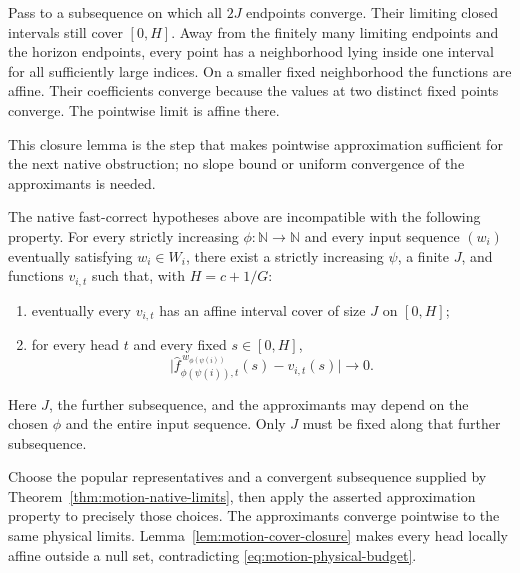 \begin{proofoutline}
Pass to a subsequence on which all $2J$ endpoints converge.  Their limiting
closed intervals still cover $[0,H]$.  Away from the finitely many limiting
endpoints and the horizon endpoints, every point has a neighborhood lying
inside one interval for all sufficiently large indices.  On a smaller fixed
neighborhood the functions are affine.  Their coefficients converge because
the values at two distinct fixed points converge.  The pointwise limit is
affine there.
\end{proofoutline}

This closure lemma is the step that makes pointwise approximation sufficient
for the next native obstruction; no slope bound or uniform convergence of
the approximants is needed.

\begin{theorem}
\label{thm:motion-pointwise}
The native fast-correct hypotheses above are incompatible with the following
property.  For every strictly increasing $\phi:\mathbb N\to\mathbb N$ and
every input sequence $(w_i)$ eventually satisfying $w_i\in W_i$, there exist
a strictly increasing $\psi$, a finite $J$, and functions $v_{i,t}$ such that,
with $H=c+1/G$:
\begin{enumerate}
\item eventually every $v_{i,t}$ has an affine interval cover of size $J$ on
$[0,H]$;
\item for every head $t$ and every fixed $s\in[0,H]$,
\[
  \bigl|\widehat f_{\phi(\psi(i)),t}^{\,w_{\phi(\psi(i))}}(s)
                 -v_{i,t}(s)\bigr|\longrightarrow0.
\]
\end{enumerate}
Here $J$, the further subsequence, and the approximants may depend on the
chosen $\phi$ and the entire input sequence.  Only $J$ must be fixed along
that further subsequence.
\end{theorem}

\begin{proofoutline}
Choose the popular representatives and a convergent subsequence supplied by
Theorem~\ref{thm:motion-native-limits}, then apply the asserted approximation
property to precisely those choices.  The approximants converge pointwise to
the same physical limits.  Lemma~\ref{lem:motion-cover-closure} makes every
head locally affine outside a null set, contradicting
\eqref{eq:motion-physical-budget}.
\end{proofoutline}


